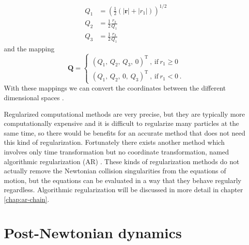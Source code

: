 \documentclass[english, oneside]{HYgradu}
\begin{document}
\begin{align}
Q_1 &= \left( \frac{1}{2} ( \left| \mathbf{r} \right| + \left| r_1 \right| ) \right)^{1/2} \nonumber \\
Q_2 &= \frac{1}{2} \frac{r_2}{Q_1} \\
Q_3 &= \frac{1}{2} \frac{r_3}{Q_1} \nonumber \ 
\end{align}
and the mapping
\begin{equation}
\mathbf{Q} = 
\begin{cases}
\left( Q_1, \ Q_2, \ Q_3, \ 0 \right)^\mathrm{T} \ , \ \mathrm{if} \ r_1 \geq 0 \\
\left( Q_1, \ Q_2, \ 0, \ Q_3 \right)^\mathrm{T} \ , \ \mathrm{if} \ r_1 < 0 \ .
\end{cases}
\end{equation}
With these mappings we can convert the coordinates between the different dimensional spaces \citep{diplomarbeit, ad}.

Regularized computational methods are very precise, but they are typically more computationally expensive and it is difficult to regularize many particles at the same time, so there would be benefits for an accurate method that does not need this kind of regularization. Fortunately there exists another method which involves only time transformation but no coordinate transformation, named algorithmic regularization (AR) \citep{diplomarbeit}. These kinds of regularization methods do not actually remove the Newtonian collision singularities from the equations of motion, but the equations can be evaluated in a way that they behave regularly regardless. Algorithmic regularization will be discussed in more detail in chapter \ref{chap:ar-chain}.



\section{Post-Newtonian dynamics} \label{sect:pndynam}
\end{document}

